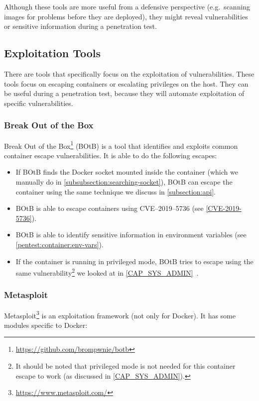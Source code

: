 Although these tools are more useful from a defensive perspective (e.g.\ scanning images for problems before they are deployed), they might reveal vulnerabilities or sensitive information during a penetration test.

\subsection{Exploitation Tools}\label{subsection:offensive-tools}
There are tools that specifically focus on the exploitation of vulnerabilities. These tools focus on escaping containers or escalating privileges on the host. They can be useful during a penetration test, because they will automate exploitation of specific vulnerabilities.

\subsubsection{Break Out of the Box}
Break Out of the Box\footnote{\url{https://github.com/brompwnie/botb}} (BOtB) is a tool that identifies and exploits common container escape vulnerabilities. It is able to do the following escapes:

\begin{itemize}
    \item If BOtB finds the Docker socket mounted inside the container (which we manually do in \autoref{subsubsection:searching-socket}), BOtB can escape the container using the same technique we discuss in \autoref{subsection:api}.

    \item BOtB is able to escape containers using CVE--2019--5736 (see \autoref{CVE-2019-5736}).

    \item BOtB is able to identify sensitive information in environment variables (see \autoref{pentest:container:env-vars}).

    \item If the container is running in privileged mode, BOtB tries to escape using the same vulnerability\footnote{It should be noted that privileged mode is not needed for this container escape to work (as discussed in \autoref{CAP_SYS_ADMIN}).} we looked at in \autoref{CAP_SYS_ADMIN}~\cite{TrailOfBits-Docker-Escape}.
\end{itemize}

\subsubsection{Metasploit}
Metasploit\footnote{\url{https://www.metasploit.com/}} is an exploitation framework (not only for Docker). It has some modules specific to Docker:

